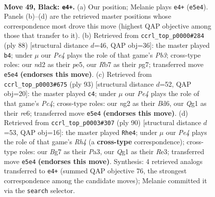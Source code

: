 \documentclass[11pt]{article}
\begin{document}
\clearpage

\begin{figure}[p]\centering
\begin{subfigure}{0.46\textwidth}\centering
\resizebox{\linewidth}{!}{%
\newchessgame
\chessboard[
  setfen={6k1/1r3pb1/R7/1n1Pp1R1/8/3K4/3N2N1/6q1 b - - 0 49},
  showmover=false,
  pgfstyle=straightmove, color=movearrow, markmove={e5-e4}
]}
\caption{}
\end{subfigure}\hfill
\begin{subfigure}{0.46\textwidth}\centering
\resizebox{\linewidth}{!}{%
\newchessgame
\chessboard[
  setfen={3b4/6p1/4kn2/N3p3/7P/1Pr1BK2/5P2/R7 w - - 1 45},
  showmover=false,
  pgfstyle=straightmove, color=movearrow, markmove={b3-b4}
]}
\caption{}
\end{subfigure}
\\[4pt]
\begin{subfigure}{0.46\textwidth}\centering
\resizebox{\linewidth}{!}{%
\newchessgame
\chessboard[
  setfen={3r4/8/3bRN2/2p2pk1/P7/5KP1/P7/8 b - - 0 47},
  showmover=false,
  pgfstyle=straightmove, color=movearrow, markmove={c5-c4}
]}
\caption{}
\end{subfigure}\hfill
\begin{subfigure}{0.46\textwidth}\centering
\resizebox{\linewidth}{!}{%
\newchessgame
\chessboard[
  setfen={8/4k3/1p2p3/r3n3/2P4R/P3R3/K7/8 w - - 3 46},
  showmover=false,
  pgfstyle=straightmove, color=movearrow, markmove={h4-e4}
]}
\caption{}
\end{subfigure}
\caption{\textbf{Move 49, Black: \texttt{e4+}.} (a) Our position; Melanie plays \texttt{e4+} (\texttt{e5e4}). Panels (b)--(d) are the retrieved master positions whose correspondence most drove this move (highest QAP objective among those that transfer to it). (b) Retrieved from \texttt{ccrl\_top\_p0000\#284} (ply 88) [structural distance $d$=46, QAP obj=36]: the master played \texttt{b4}; under $\mu$ our \emph{Pe4} plays the role of that game's \emph{Pb3}; cross-type roles: our \emph{n}d2 as their \emph{p}e5, our \emph{R}b7 as their \emph{p}g7; transferred move \texttt{e5e4} \textbf{(endorses this move)}. (c) Retrieved from \texttt{ccrl\_top\_p0003\#675} (ply 93) [structural distance $d$=52, QAP obj=20]: the master played \texttt{c4}; under $\mu$ our \emph{Pe4} plays the role of that game's \emph{Pc4}; cross-type roles: our \emph{n}g2 as their \emph{B}d6, our \emph{Q}g1 as their \emph{r}e6; transferred move \texttt{e5e4} \textbf{(endorses this move)}. (d) Retrieved from \texttt{ccrl\_top\_p0003\#307} (ply 90) [structural distance $d$=53, QAP obj=16]: the master played \texttt{Rhe4}; under $\mu$ our \emph{Pe4} plays the role of that game's \emph{Rh4} (a \textbf{cross-type} correspondence); cross-type roles: our \emph{B}g7 as their \emph{P}a3, our \emph{Q}g1 as their \emph{R}e3; transferred move \texttt{e5e4} \textbf{(endorses this move)}. Synthesis: 4 retrieved analogs transferred to \texttt{e4+} (summed QAP objective 76, the strongest correspondence among the candidate moves); Melanie committed it via the \texttt{search} selector.}
\label{fig:thought-m97}
\end{figure}
\end{document}
